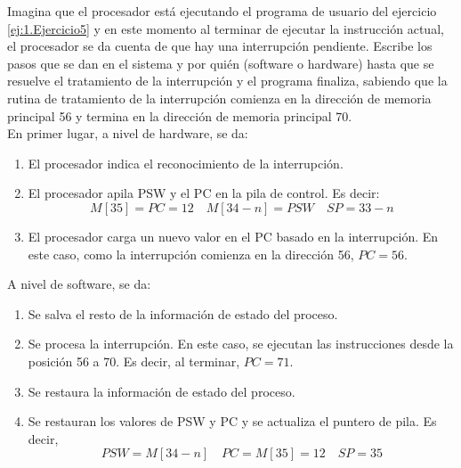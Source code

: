 \begin{ejercicio}\label{Ejercicio7}
    Imagina que el procesador está ejecutando el programa de usuario del ejercicio \ref{ej:1.Ejercicio5} y en este momento al terminar de ejecutar la instrucción actual, el procesador se da cuenta de que hay una interrupción pendiente. Escribe los pasos que se dan en el sistema y por quién (software o hardware) hasta que se resuelve el tratamiento de la interrupción y el programa finaliza, sabiendo que la rutina de tratamiento de la interrupción comienza en la dirección de memoria principal 56 y termina en la dirección de memoria principal 70.\\

    \noindent En primer lugar, a nivel de hardware, se da:
    \begin{enumerate}
        \item El procesador indica el reconocimiento de la interrupción.
        \item El procesador apila PSW y el PC en la pila de control. Es decir:
            \begin{equation*}
                 M[35]=PC=12 \quad M[34-n]=PSW \quad SP=33-n
            \end{equation*}
        \item \label{Ej7:UltItem} El procesador carga un nuevo valor en el PC basado en la interrupción. En este caso, como la interrupción comienza en la dirección 56, $PC=56$.
    \end{enumerate}

    \noindent A nivel de software, se da:
    \begin{enumerate}[resume]
        \item Se salva el resto de la información de estado del proceso.
        \item Se procesa la interrupción. En este caso, se ejecutan las instrucciones desde la posición 56 a 70. Es decir, al terminar, $PC=71$.
        \item Se restaura la información de estado del proceso.
        \item Se restauran los valores de PSW y PC y se actualiza el puntero de pila. Es decir,
        \begin{equation*}
            PSW=M[34-n] \quad PC=M[35]=12 \quad SP=35
        \end{equation*}
    \end{enumerate}
\end{ejercicio}

